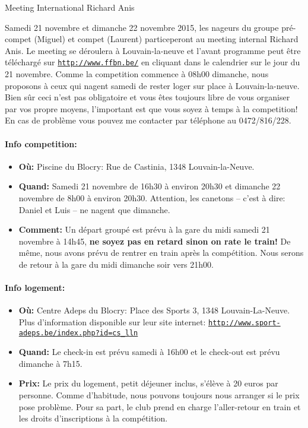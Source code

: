 \documentclass{article}
\begin{document}
\begin{center}\huge{Meeting International Richard Anis}\end{center}

Samedi 21 novembre et dimanche 22 novembre 2015, les nageurs du groupe pré-compet (Miguel) et compet (Laurent) particeperont au meeting internal Richard Anis.
Le meeting se déroulera à Louvain-la-neuve et l'avant programme peut être téléchargé sur \texttt{\url{http://www.ffbn.be/}} en cliquant dans le calendrier sur le jour du 21 novembre.
Comme la competition commence à 08h00 dimanche, nous proposons à ceux qui nagent samedi de rester loger sur place à Louvain-la-neuve.
Bien sûr ceci n'est pas obligatoire et vous êtes toujours libre de vous organiser par vos propre moyens, l'important est que vous soyez à temps à la competition!
En cas de problème vous pouvez me contacter par téléphone au 0472/816/228.

\paragraph{Info competition:}
\begin{itemize}
\item \textbf{Où:}
Piscine du Blocry: Rue de Castinia, 1348 Louvain-la-Neuve.
\item \textbf{Quand:}
Samedi 21 novembre de 16h30 à environ 20h30 et dimanche 22 novembre de 8h00 à environ 20h30.
Attention, les canetons -- c'est à dire: Daniel et Luis -- ne nagent que dimanche.
\item \textbf{Comment:}
Un départ groupé est prévu à la gare du midi samedi 21 novembre à 14h45, \textbf{ne soyez pas en retard sinon on rate le train!}
De même, nous avons prévu de rentrer en train après la compétition.
Nous serons de retour à la gare du midi dimanche soir vers 21h00.
\end{itemize}

\paragraph{Info logement:}
\begin{itemize}
\item \textbf{Où:}
Centre Adeps du Blocry: Place des Sports 3, 1348 Louvain-La-Neuve.
Plus d'information disponible sur leur site internet: \texttt{\url{http://www.sport-adeps.be/index.php?id=cs_lln}}
\item \textbf{Quand:}
Le check-in est prévu samedi à 16h00 et le check-out est prévu dimanche à 7h15.
\item \textbf{Prix:}
Le prix du logement, petit déjeuner inclus, s'élève à 20 euros par personne.
Comme d'habitude, nous pouvons toujours nous arranger si le prix pose problème.
Pour sa part, le club prend en charge l'aller-retour en train et les droits d'inscriptions à la compétition.
\end{itemize}
\end{document}
